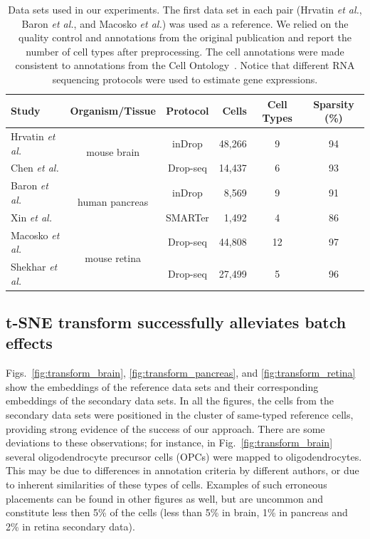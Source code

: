 \documentclass[runningheads]{llncs}
\newcommand{\etal}{\textit{et al.}}
\begin{document}
\vspace{-3mm}
\begin{table}[ht]
\begin{center}
\setlength\tabcolsep{4pt}
\begin{tabular}{l c c r c c}
\toprule
Study & Organism/Tissue & Protocol & Cells & Cell Types & Sparsity (\%) \\
\midrule
Hrvatin \etal & \multirow{2}{*}{mouse brain} & inDrop & 48,266 & 9 & 94 \\
Chen \etal & & Drop-seq & 14,437 & 6 & 93 \\[5pt]
Baron \etal & \multirow{2}{*}{human pancreas} & inDrop & 8,569 & 9 & 91 \\
Xin \etal & & SMARTer & 1,492 & 4 & 86 \\[5pt]
Macosko \etal & \multirow{2}{*}{mouse retina} & Drop-seq & 44,808 & 12 & 97 \\
Shekhar \etal & & Drop-seq & 27,499 & 5 & 96 \\
\bottomrule
\end{tabular}
\end{center}
\caption{Data sets used in our experiments. The first data set in each pair
(Hrvatin \etal, Baron \etal, and Macosko \etal) was used as a reference.  We
relied on the quality control and annotations from the original publication
and report the number of cell types after preprocessing.  The cell
annotations were made consistent to annotations from the Cell
Ontology~\cite{Bard2005}. Notice that different RNA sequencing protocols
were used to estimate gene expressions.}
\label{tab:data sets}
\end{table}

\subsection{t-SNE transform successfully alleviates batch effects}
\label{sec:results}

Figs.~\ref{fig:transform_brain}, \ref{fig:transform_pancreas}, and
\ref{fig:transform_retina} show the embeddings of the reference data sets and
their corresponding embeddings of the secondary data sets. In all the figures,
the cells from the secondary data sets were positioned in the cluster of
same-typed reference cells, providing strong evidence of the success of our approach. There are some deviations to these observations; for
instance, in Fig.~\ref{fig:transform_brain} several oligodendrocyte precursor
cells (OPCs) were mapped to oligodendrocytes. This may be due to differences in
annotation criteria by different authors, or due to inherent similarities of
these types of cells. Examples of such erroneous placements can be found in
other figures as well, but are uncommon and constitute less then 5\% of
the cells (less than 5\% in brain, 1\% in pancreas and 2\% in retina
secondary data).
\end{document}
